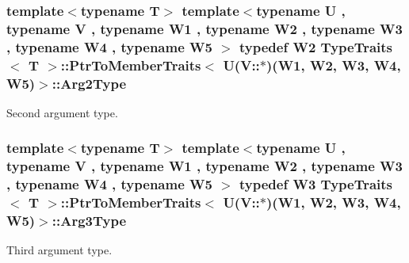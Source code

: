 \subsubsection[{\texorpdfstring{Arg2\+Type}{Arg2Type}}]{\setlength{\rightskip}{0pt plus 5cm}template$<$typename T$>$ template$<$typename U , typename V , typename W1 , typename W2 , typename W3 , typename W4 , typename W5 $>$ typedef W2 {\bf Type\+Traits}$<$ T $>$\+::{\bf Ptr\+To\+Member\+Traits}$<$ U(V\+::$\ast$)(W1, W2, W3, W4, W5)$>$\+::{\bf Arg2\+Type}}\hypertarget{structTypeTraits_1_1PtrToMemberTraits_3_01U_07V_1_1_5_08_07W1_00_01W2_00_01W3_00_01W4_00_01W5_08_4_ab54ad831fab72bdfdfbd942c15bca42b}{}\label{structTypeTraits_1_1PtrToMemberTraits_3_01U_07V_1_1_5_08_07W1_00_01W2_00_01W3_00_01W4_00_01W5_08_4_ab54ad831fab72bdfdfbd942c15bca42b}
Second argument type. 
\subsubsection[{\texorpdfstring{Arg3\+Type}{Arg3Type}}]{\setlength{\rightskip}{0pt plus 5cm}template$<$typename T$>$ template$<$typename U , typename V , typename W1 , typename W2 , typename W3 , typename W4 , typename W5 $>$ typedef W3 {\bf Type\+Traits}$<$ T $>$\+::{\bf Ptr\+To\+Member\+Traits}$<$ U(V\+::$\ast$)(W1, W2, W3, W4, W5)$>$\+::{\bf Arg3\+Type}}\hypertarget{structTypeTraits_1_1PtrToMemberTraits_3_01U_07V_1_1_5_08_07W1_00_01W2_00_01W3_00_01W4_00_01W5_08_4_a9f60e7a49ddc0f06b2e3de29a2a9e613}{}\label{structTypeTraits_1_1PtrToMemberTraits_3_01U_07V_1_1_5_08_07W1_00_01W2_00_01W3_00_01W4_00_01W5_08_4_a9f60e7a49ddc0f06b2e3de29a2a9e613}
Third argument type. 
